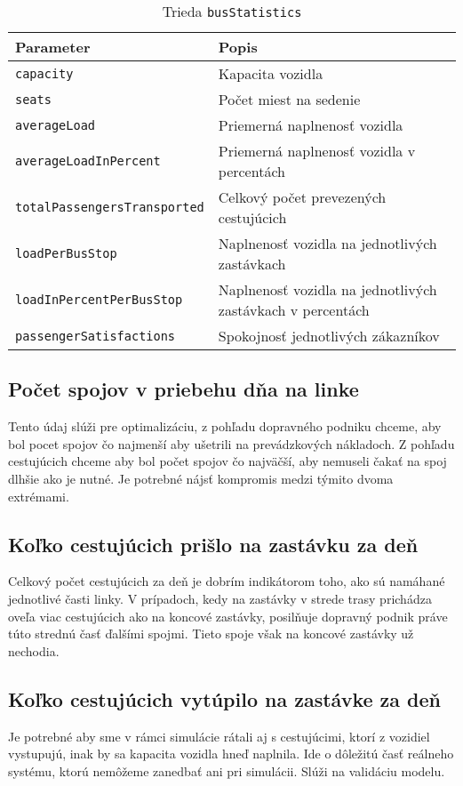 \begin{table}[h]\label{tab:busStatistics_class}
  \centering
  \begin{tabularx}{\textwidth}{|l|X|}
    \hline
    \textbf{Parameter} & \textbf{Popis} \\ \hline
    \texttt{capacity} & Kapacita vozidla \\ \hline
    \texttt{seats} & Počet miest na sedenie \\ \hline
    \texttt{averageLoad} & Priemerná naplnenosť vozidla \\ \hline
    \texttt{averageLoadInPercent} & Priemerná naplnenosť vozidla v percentách \\ \hline
    \texttt{totalPassengersTransported} & Celkový počet prevezených cestujúcich \\ \hline
    \texttt{loadPerBusStop} & Naplnenosť vozidla na jednotlivých zastávkach \\ \hline
    \texttt{loadInPercentPerBusStop} & Naplnenosť vozidla na jednotlivých zastávkach v percentách \\ \hline
    \texttt{passengerSatisfactions} & Spokojnosť jednotlivých zákazníkov \\ \hline
  \end{tabularx}
  \caption{Trieda \texttt{busStatistics}}
\end{table}

\subsection*{Počet spojov v priebehu dňa na linke}
Tento údaj slúži pre optimalizáciu, z pohľadu dopravného podniku chceme, aby bol pocet spojov čo najmenší aby ušetrili na prevádzkových nákladoch.
Z pohľadu cestujúcich chceme aby bol počet spojov čo najväčší, aby nemuseli čakať na spoj dlhšie ako je nutné.
Je potrebné nájsť kompromis medzi týmito dvoma extrémami.

\subsection*{Koľko cestujúcich prišlo na zastávku za deň}
Celkový počet cestujúcich za deň je dobrím indikátorom toho, ako sú namáhané jednotlivé časti linky.
V prípadoch, kedy na zastávky v strede trasy prichádza oveľa viac cestujúcich ako na koncové zastávky, posilňuje dopravný podnik práve túto strednú časť ďalšími spojmi.
Tieto spoje však na koncové zastávky už nechodia.

\subsection*{Koľko cestujúcich vytúpilo na zastávke za deň}
Je potrebné aby sme v rámci simulácie rátali aj s cestujúcimi, ktorí z vozidiel vystupujú, inak by sa kapacita vozidla hneď naplnila.
Ide o dôležitú časť reálneho systému, ktorú nemôžeme zanedbať ani pri simulácii.
Slúži na validáciu modelu.

